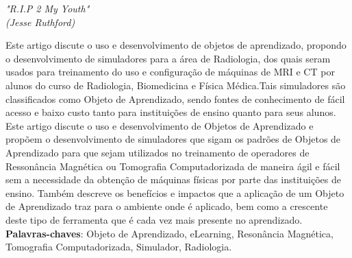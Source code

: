 \documentclass[12pt,openright,oneside,a4paper,english,french,spanish,brazil]{unifil}
\begin{document}

\begin{epigrafe}
\vspace*{\fill}
\begin{flushright}
\textit{"R.I.P 2 My Youth" \\
(Jesse Ruthford)}
\end{flushright}
\end{epigrafe}

\par
\begin{resumo}
Este artigo discute o uso e desenvolvimento de objetos de aprendizado, propondo o desenvolvimento de simuladores para a área de Radiologia, dos quais seram usados para treinamento do uso e configuração de máquinas de MRI e CT por alunos do curso de Radiologia, Biomedicina e Física Médica.Tais simuladores são classificados como Objeto de Aprendizado, sendo fontes de conhecimento de fácil acesso e baixo custo tanto para instituições de ensino quanto para seus alunos.
\\ %
Este artigo discute o uso e desenvolvimento de Objetos de Aprendizado e propõem o desenvolvimento de simuladores que sigam os padrões de Objetos de Aprendizado para que sejam utilizados no treinamento de operadores de Ressonância Magnética ou Tomografia Computadorizada de maneira ágil e fácil sem a necessidade da obtenção de máquinas físicas por parte das instituições de ensino. Também descreve os benefícios e impactos que a aplicação de um Objeto de Aprendizado traz para o ambiente onde é aplicado, bem como a crescente deste tipo de ferramenta que é cada vez mais presente no aprendizado.
\vspace{\onelineskip} \\
\noindent
\textbf{Palavras-chaves}: Objeto de Aprendizado, eLearning, Resonância Magnética, Tomografia Computadorizada, Simulador, Radiologia.
\end{resumo}
\end{document}
